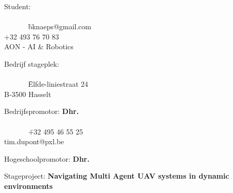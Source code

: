 \begin{tabbing}
  Student: \textbf{\student}\\
  \\
  ~~~~~~ \= bknaeps@gmail.com\\
  \> +32 493 76 70 83\\
  \> AON - AI \& Robotics
\end{tabbing}
\begin{tabbing}
  Bedrijf stageplek: \textbf{\stagebedrijf}\\
  \\
  ~~~~~~ \= Elfde-liniestraat 24\\
  \> B-3500 Hasselt
\end{tabbing}
\begin{tabbing}
  Bedrijfspromotor: \textbf{Dhr. \bedrijfspromotor}\\
  \\
  ~~~~~~ \= +32 495 46 55 25\\
  \> tim.dupont@pxl.be
\end{tabbing}
\begin{tabbing}
  Hogeschoolpromotor: \textbf{Dhr. \hogeschoolpromotor}
\end{tabbing}
\clearpage 
Stageproject: \textbf{Navigating Multi Agent UAV systems in dynamic environments}
